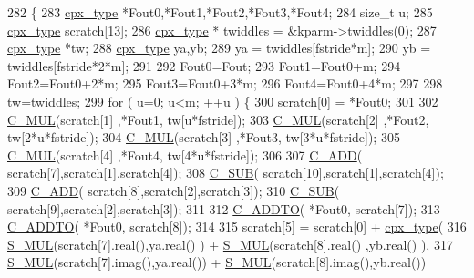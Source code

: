 \begin{DoxyCode}
282     \{
283         \hyperlink{classcudafft_a6b6e4901630f197baf4cf7f165543ece}{cpx\_type} *Fout0,*Fout1,*Fout2,*Fout3,*Fout4;
284         \textcolor{keywordtype}{size\_t} u;
285         \hyperlink{classcudafft_a6b6e4901630f197baf4cf7f165543ece}{cpx\_type} scratch[13];
286         \hyperlink{classcudafft_a6b6e4901630f197baf4cf7f165543ece}{cpx\_type} * twiddles = &kparm->twiddles(0);
287         \hyperlink{classcudafft_a6b6e4901630f197baf4cf7f165543ece}{cpx\_type} *tw;
288         \hyperlink{classcudafft_a6b6e4901630f197baf4cf7f165543ece}{cpx\_type} ya,yb;
289         ya = twiddles[fstride*m];
290         yb = twiddles[fstride*2*m];
291 
292         Fout0=Fout;
293         Fout1=Fout0+m;
294         Fout2=Fout0+2*m;
295         Fout3=Fout0+3*m;
296         Fout4=Fout0+4*m;
297 
298         tw=twiddles;
299         \textcolor{keywordflow}{for} ( u=0; u<m; ++u ) \{
300             scratch[0] = *Fout0;
301 
302             \hyperlink{classcudafft_ac7462d0245377968239aabcc6e942a76}{C\_MUL}(scratch[1] ,*Fout1, tw[u*fstride]);
303             \hyperlink{classcudafft_ac7462d0245377968239aabcc6e942a76}{C\_MUL}(scratch[2] ,*Fout2, tw[2*u*fstride]);
304             \hyperlink{classcudafft_ac7462d0245377968239aabcc6e942a76}{C\_MUL}(scratch[3] ,*Fout3, tw[3*u*fstride]);
305             \hyperlink{classcudafft_ac7462d0245377968239aabcc6e942a76}{C\_MUL}(scratch[4] ,*Fout4, tw[4*u*fstride]);
306 
307             \hyperlink{classcudafft_a014fac9955f6dc417ae80544132f98e4}{C\_ADD}( scratch[7],scratch[1],scratch[4]);
308             \hyperlink{classcudafft_a62e0deba21ac6217451ce410b0029812}{C\_SUB}( scratch[10],scratch[1],scratch[4]);
309             \hyperlink{classcudafft_a014fac9955f6dc417ae80544132f98e4}{C\_ADD}( scratch[8],scratch[2],scratch[3]);
310             \hyperlink{classcudafft_a62e0deba21ac6217451ce410b0029812}{C\_SUB}( scratch[9],scratch[2],scratch[3]);
311 
312             \hyperlink{classcudafft_ad4a6c8f97cdf80be567abfceeada59ad}{C\_ADDTO}( *Fout0, scratch[7]);
313             \hyperlink{classcudafft_ad4a6c8f97cdf80be567abfceeada59ad}{C\_ADDTO}( *Fout0, scratch[8]);
314 
315             scratch[5] = scratch[0] + \hyperlink{classcudafft_a6b6e4901630f197baf4cf7f165543ece}{cpx\_type}(
316                     \hyperlink{classcudafft_a3b3a4acd07911e5e3c27ae34347b7b4e}{S\_MUL}(scratch[7].real(),ya.real() ) + \hyperlink{classcudafft_a3b3a4acd07911e5e3c27ae34347b7b4e}{S\_MUL}(scratch[8].real() ,yb.real() ),
317                     \hyperlink{classcudafft_a3b3a4acd07911e5e3c27ae34347b7b4e}{S\_MUL}(scratch[7].imag(),ya.real()) + \hyperlink{classcudafft_a3b3a4acd07911e5e3c27ae34347b7b4e}{S\_MUL}(scratch[8].imag(),yb.real())

\end{DoxyCode}
